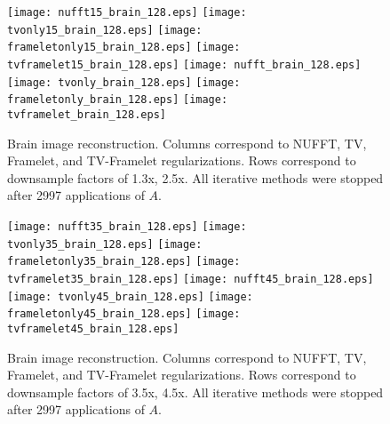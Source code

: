 \documentclass[xcolor=dvipsnames]{beamer}
\theoremstyle{remark}
\begin{document}
\begin{frame}
\begin{center}
\begin{figure}
\texttt{[image: nufft15\_brain\_128.eps]}
\texttt{[image: tvonly15\_brain\_128.eps]}
\texttt{[image: frameletonly15\_brain\_128.eps]}
\texttt{[image: tvframelet15\_brain\_128.eps]}
\linebreak
\texttt{[image: nufft\_brain\_128.eps]}
\texttt{[image: tvonly\_brain\_128.eps]}
\texttt{[image: frameletonly\_brain\_128.eps]}
\texttt{[image: tvframelet\_brain\_128.eps]}
\caption{Brain image reconstruction. Columns correspond to NUFFT, TV, Framelet, and TV-Framelet regularizations. Rows correspond to downsample factors of 1.3x, 2.5x. All iterative methods were stopped after 2997 applications of $A$.}
\end{figure}
\end{center}
\end{frame}

\begin{frame}
\begin{center}
\begin{figure}
\texttt{[image: nufft35\_brain\_128.eps]}
\texttt{[image: tvonly35\_brain\_128.eps]}
\texttt{[image: frameletonly35\_brain\_128.eps]}
\texttt{[image: tvframelet35\_brain\_128.eps]}
\linebreak
\texttt{[image: nufft45\_brain\_128.eps]}
\texttt{[image: tvonly45\_brain\_128.eps]}
\texttt{[image: frameletonly45\_brain\_128.eps]}
\texttt{[image: tvframelet45\_brain\_128.eps]}
\caption{Brain image reconstruction. Columns correspond to NUFFT, TV, Framelet, and TV-Framelet regularizations. Rows correspond to downsample factors of 3.5x, 4.5x. All iterative methods were stopped after 2997 applications of $A$.}
\end{figure}
\end{center}
\end{frame}
\end{document}
